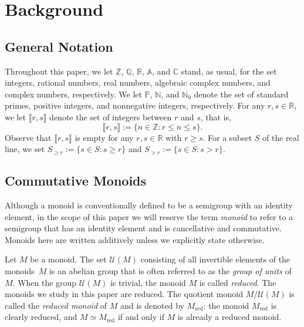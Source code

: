 \documentclass[11pt]{amsart}
\theoremstyle{definition}
\theoremstyle{remark}
\numberwithin{equation}{section}
\newcommand{\aaa}{\mathbb{A}}
\newcommand{\cc}{\mathbb{C}}
\newcommand{\ff}{\mathbb{F}}
\newcommand{\nn}{\mathbb{N}}
\newcommand{\pp}{\mathbb{P}}
\newcommand{\qq}{\mathbb{Q}}
\newcommand{\rr}{\mathbb{R}}
\newcommand{\zz}{\mathbb{Z}}
\providecommand\ldb{\llbracket}
\providecommand\rdb{\rrbracket}
\newcommand{\uu}{\mathcal{U}}
\begin{document}
\bigskip


\section{Background}
\label{sec:background}

\subsection{General Notation}

Throughout this paper, we let $\zz$, $\qq$, $\rr$, $\aaa$, and $\cc$ stand, as usual, for the set integers, rational numbers, real numbers, algebraic complex numbers, and complex numbers, respectively. We let $\pp$, $\nn$, and $\nn_0$ denote the set of standard primes, positive integers, and nonnegative integers, respectively. %
For any $r,s \in \rr$, we let $\ldb r,s \rdb$ denote the set of integers between $r$ and $s$, that is,
\[
	\ldb r,s \rdb := \{n \in \zz : r \le n \le s\}.
\]
Observe that $\ldb r,s \rdb$ is empty for any $r,s \in \rr$ with $r \geq s$. For a subset $S$ of the real line, we set $S_{\ge r} := \{s \in S : s \ge r\}$ and $S_{> r} := \{s \in S : s > r\}$.

\medskip

\subsection{Commutative Monoids}

Although a monoid is conventionally defined to be a semigroup with an identity element, in the scope of this paper we will reserve the term \emph{monoid} to refer to a semigroup that has an identity element and is cancellative and commutative. Monoids here are written additively unless we explicitly state otherwise.
\smallskip

Let $M$ be a monoid. The set $\uu(M)$ consisting of all invertible elements of the monoids~$M$ is an abelian group that is often referred to as the \emph{group of units} of~$M$. When the group $\uu(M)$ is trivial, the monoid $M$ is called \emph{reduced}. The monoids we study in this paper are reduced. The quotient monoid $M/\uu(M)$ is called the \emph{reduced monoid} of $M$ and is denoted by $M_\text{red}$: the monoid $M_{\text{red}}$ is clearly reduced, and $M \simeq M_{\text{red}}$ if and only if $M$ is already a reduced monoid.
\smallskip
\end{document}
